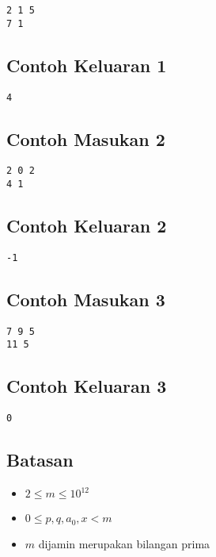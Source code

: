\documentclass{article}
\begin{document}
\begin{lstlisting}
2 1 5
7 1
\end{lstlisting}

\subsection*{Contoh Keluaran 1}

\begin{lstlisting}
4
\end{lstlisting}

\subsection*{Contoh Masukan 2}

\begin{lstlisting}
2 0 2
4 1
\end{lstlisting}

\subsection*{Contoh Keluaran 2}

\begin{lstlisting}
-1
\end{lstlisting}

\subsection*{Contoh Masukan 3}

\begin{lstlisting}
7 9 5
11 5
\end{lstlisting}

\subsection*{Contoh Keluaran 3}

\begin{lstlisting}
0
\end{lstlisting}

\subsection*{Batasan}

\begin{itemize}
  \item $2 \leq m \leq 10^{12}$
  \item $0 \leq p, q, a_0, x < m$
  \item $m$ dijamin merupakan bilangan prima
\end{itemize}
\end{document}
